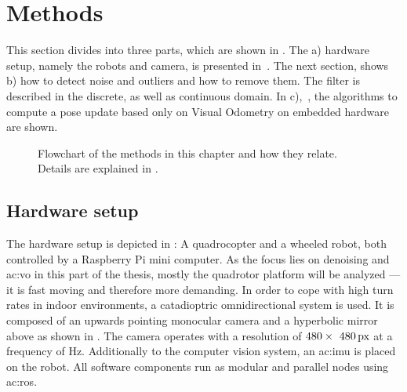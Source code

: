 \section{Methods}
\label{sec:perception_methods}


This section divides into three parts, which are shown in .
The a) hardware setup, namely the robots and camera, is presented in~.
The next section,  shows b) how to detect noise and outliers and how to remove them.
The filter is described in the discrete, as well as continuous domain.
In c),~, the algorithms to compute a pose update based only on Visual Odometry on embedded hardware are shown. 

\begin{figure}[]
  \centering
  
  \caption{Flowchart of the methods in this chapter and how they relate. Details are explained in .}
  \label{fig:perception_methods_flowchart}
\end{figure}





\subsection{Hardware setup}
\label{ssec:perception_methods_hardwaresetup}

The hardware setup is depicted in : A quadrocopter and a wheeled robot, both controlled by a Raspberry Pi mini computer.
As the focus lies on denoising and \gls{ac:vo} in this part of the thesis, mostly the quadrotor platform will be analyzed --- it is fast moving and therefore more demanding.
In order to cope with high turn rates in indoor environments, a catadioptric omnidirectional system is used.
It is composed of an upwards pointing monocular camera and a hyperbolic mirror above as shown in .
The camera operates with a resolution of $\unit[480 \times\ 480]{px}$ at a frequency of \unit[30]{Hz}.
Additionally to the computer vision system, an \gls{ac:imu} is placed on the robot.
All software components run as modular and parallel nodes using \gls{ac:ros}.





